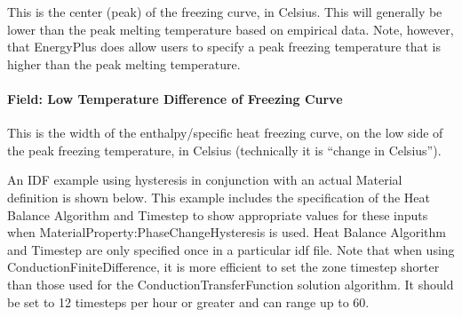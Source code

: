 This is the center (peak) of the freezing curve, in Celsius.  This will generally be lower than the peak melting temperature based on empirical data.  Note, however, that EnergyPlus does allow users to specify a peak freezing temperature that is higher than the peak melting temperature.

\paragraph{Field: Low Temperature Difference of Freezing Curve}\label{materialpropertyphasechangehysteresis-inputs-low-temperature-difference-of-freezing-curve}

This is the width of the enthalpy/specific heat freezing curve, on the low side of the peak freezing temperature, in Celsius (technically it is ``change in Celsius'').

An IDF example using hysteresis in conjunction with an actual Material definition is shown below.  This example includes the specification of the Heat Balance Algorithm and Timestep to show appropriate values for these inputs when MaterialProperty:PhaseChangeHysteresis is used.  Heat Balance Algorithm and Timestep are only specified once in a particular idf file.  Note that when using ConductionFiniteDifference, it is more efficient to set the zone timestep shorter than those used for the ConductionTransferFunction solution algorithm.  It should be set to 12 timesteps per hour or greater and can range up to 60.

